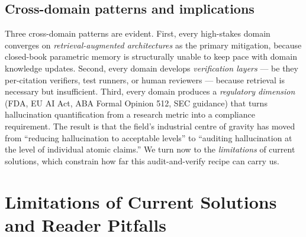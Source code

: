 \subsection{Cross-domain patterns and implications}\label{cross-domain-patterns-and-implications}

Three cross-domain patterns are evident. First, every high-stakes domain converges on \emph{retrieval-augmented architectures} as the primary mitigation, because closed-book parametric memory is structurally unable to keep pace with domain knowledge updates. Second, every domain develops \emph{verification layers} --- be they per-citation verifiers, test runners, or human reviewers --- because retrieval is necessary but insufficient. Third, every domain produces a \emph{regulatory dimension} (FDA, EU AI Act, ABA Formal Opinion 512, SEC guidance) that turns hallucination quantification from a research metric into a compliance requirement. The result is that the field's industrial centre of gravity has moved from ``reducing hallucination to acceptable levels'' to ``auditing hallucination at the level of individual atomic claims.'' We turn now to the \emph{limitations} of current solutions, which constrain how far this audit-and-verify recipe can carry us.

\section{Limitations of Current Solutions and Reader Pitfalls}\label{limitations-of-current-solutions-and-reader-pitfalls}

